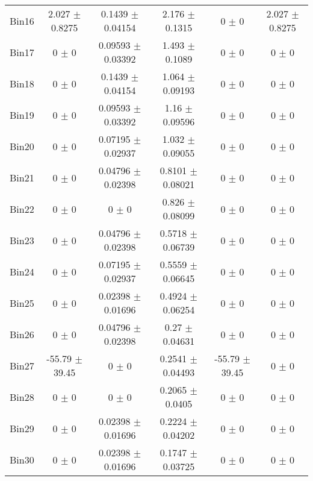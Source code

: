 \begin{tabular}{@{\extracolsep{4pt}}lccccc@{}}
     Bin16 & 2.027 $\pm$ 0.8275 & 0.1439 $\pm$ 0.04154 & 2.176 $\pm$ 0.1315 & 0 $\pm$ 0 & 2.027 $\pm$ 0.8275 \\ 
     Bin17 & 0 $\pm$ 0 & 0.09593 $\pm$ 0.03392 & 1.493 $\pm$ 0.1089 & 0 $\pm$ 0 & 0 $\pm$ 0 \\ 
     Bin18 & 0 $\pm$ 0 & 0.1439 $\pm$ 0.04154 & 1.064 $\pm$ 0.09193 & 0 $\pm$ 0 & 0 $\pm$ 0 \\ 
     Bin19 & 0 $\pm$ 0 & 0.09593 $\pm$ 0.03392 & 1.16 $\pm$ 0.09596 & 0 $\pm$ 0 & 0 $\pm$ 0 \\ 
     Bin20 & 0 $\pm$ 0 & 0.07195 $\pm$ 0.02937 & 1.032 $\pm$ 0.09055 & 0 $\pm$ 0 & 0 $\pm$ 0 \\ 
     Bin21 & 0 $\pm$ 0 & 0.04796 $\pm$ 0.02398 & 0.8101 $\pm$ 0.08021 & 0 $\pm$ 0 & 0 $\pm$ 0 \\ 
     Bin22 & 0 $\pm$ 0 & 0 $\pm$ 0 & 0.826 $\pm$ 0.08099 & 0 $\pm$ 0 & 0 $\pm$ 0 \\ 
     Bin23 & 0 $\pm$ 0 & 0.04796 $\pm$ 0.02398 & 0.5718 $\pm$ 0.06739 & 0 $\pm$ 0 & 0 $\pm$ 0 \\ 
     Bin24 & 0 $\pm$ 0 & 0.07195 $\pm$ 0.02937 & 0.5559 $\pm$ 0.06645 & 0 $\pm$ 0 & 0 $\pm$ 0 \\ 
     Bin25 & 0 $\pm$ 0 & 0.02398 $\pm$ 0.01696 & 0.4924 $\pm$ 0.06254 & 0 $\pm$ 0 & 0 $\pm$ 0 \\ 
     Bin26 & 0 $\pm$ 0 & 0.04796 $\pm$ 0.02398 & 0.27 $\pm$ 0.04631 & 0 $\pm$ 0 & 0 $\pm$ 0 \\ 
     Bin27 & -55.79 $\pm$ 39.45 & 0 $\pm$ 0 & 0.2541 $\pm$ 0.04493 & -55.79 $\pm$ 39.45 & 0 $\pm$ 0 \\ 
     Bin28 & 0 $\pm$ 0 & 0 $\pm$ 0 & 0.2065 $\pm$ 0.0405 & 0 $\pm$ 0 & 0 $\pm$ 0 \\ 
     Bin29 & 0 $\pm$ 0 & 0.02398 $\pm$ 0.01696 & 0.2224 $\pm$ 0.04202 & 0 $\pm$ 0 & 0 $\pm$ 0 \\ 
     Bin30 & 0 $\pm$ 0 & 0.02398 $\pm$ 0.01696 & 0.1747 $\pm$ 0.03725 & 0 $\pm$ 0 & 0 $\pm$ 0 \\ 
\hline\hline
  \end{tabular}
